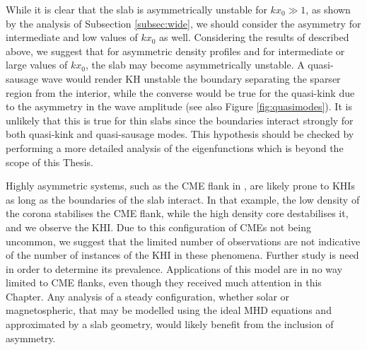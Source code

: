 \documentclass[12pt]{ociamthesis}
\begin{document}
While it is clear that the slab is asymmetrically unstable for $k x_0 \gg 1$, as shown by the analysis of Subsection \ref{subsec:wide}, we should consider the asymmetry for intermediate and low values of $k x_0$ as well.
Considering the results of \cite{Allcock2017} described above, we suggest that for asymmetric density profiles and for intermediate or large values of $k x_0$, the slab may become asymmetrically unstable.
A quasi-sausage wave would render KH unstable the boundary separating the sparser region from the interior, while the converse would be true for the quasi-kink due to the asymmetry in the wave amplitude (see also Figure \ref{fig:quasimodes}).
It is unlikely that this is true for thin slabs since the boundaries interact strongly for both quasi-kink and quasi-sausage modes.
This hypothesis should be checked by performing a more detailed analysis of the eigenfunctions which is beyond the scope of this Thesis.

Highly asymmetric systems, such as the CME flank in \cite{Foullon2011}, are likely prone to KHIs as long as the boundaries of the slab interact.
In that example, the low density of the corona stabilises the CME flank, while the high density core destabilises it, and we observe the KHI.
Due to this configuration of CMEs not being uncommon, we suggest that the limited number of observations are not indicative of the number of instances of the KHI in these phenomena.
Further study is need in order to determine its prevalence.
Applications of this model are in no way limited to CME flanks, even though they received much attention in this Chapter.
Any analysis of a steady configuration, whether solar or magnetospheric, that may be modelled using the ideal MHD equations and approximated by a slab geometry, would likely benefit from the inclusion of asymmetry.




\end{document}
